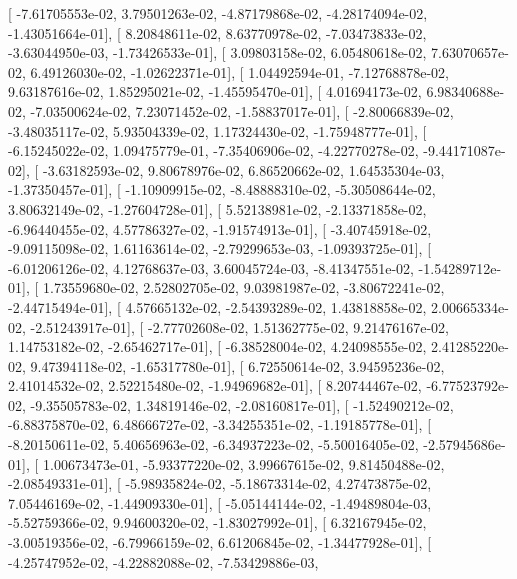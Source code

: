 \documentclass{article}
\begin{document}
       [ -7.61705553e-02,   3.79501263e-02,  -4.87179868e-02,
         -4.28174094e-02,  -1.43051664e-01],
       [  8.20848611e-02,   8.63770978e-02,  -7.03473833e-02,
         -3.63044950e-03,  -1.73426533e-01],
       [  3.09803158e-02,   6.05480618e-02,   7.63070657e-02,
          6.49126030e-02,  -1.02622371e-01],
       [  1.04492594e-01,  -7.12768878e-02,   9.63187616e-02,
          1.85295021e-02,  -1.45595470e-01],
       [  4.01694173e-02,   6.98340688e-02,  -7.03500624e-02,
          7.23071452e-02,  -1.58837017e-01],
       [ -2.80066839e-02,  -3.48035117e-02,   5.93504339e-02,
          1.17324430e-02,  -1.75948777e-01],
       [ -6.15245022e-02,   1.09475779e-01,  -7.35406906e-02,
         -4.22770278e-02,  -9.44171087e-02],
       [ -3.63182593e-02,   9.80678976e-02,   6.86520662e-02,
          1.64535304e-03,  -1.37350457e-01],
       [ -1.10909915e-02,  -8.48888310e-02,  -5.30508644e-02,
          3.80632149e-02,  -1.27604728e-01],
       [  5.52138981e-02,  -2.13371858e-02,  -6.96440455e-02,
          4.57786327e-02,  -1.91574913e-01],
       [ -3.40745918e-02,  -9.09115098e-02,   1.61163614e-02,
         -2.79299653e-03,  -1.09393725e-01],
       [ -6.01206126e-02,   4.12768637e-03,   3.60045724e-03,
         -8.41347551e-02,  -1.54289712e-01],
       [  1.73559680e-02,   2.52802705e-02,   9.03981987e-02,
         -3.80672241e-02,  -2.44715494e-01],
       [  4.57665132e-02,  -2.54393289e-02,   1.43818858e-02,
          2.00665334e-02,  -2.51243917e-01],
       [ -2.77702608e-02,   1.51362775e-02,   9.21476167e-02,
          1.14753182e-02,  -2.65462717e-01],
       [ -6.38528004e-02,   4.24098555e-02,   2.41285220e-02,
          9.47394118e-02,  -1.65317780e-01],
       [  6.72550614e-02,   3.94595236e-02,   2.41014532e-02,
          2.52215480e-02,  -1.94969682e-01],
       [  8.20744467e-02,  -6.77523792e-02,  -9.35505783e-02,
          1.34819146e-02,  -2.08160817e-01],
       [ -1.52490212e-02,  -6.88375870e-02,   6.48666727e-02,
         -3.34255351e-02,  -1.19185778e-01],
       [ -8.20150611e-02,   5.40656963e-02,  -6.34937223e-02,
         -5.50016405e-02,  -2.57945686e-01],
       [  1.00673473e-01,  -5.93377220e-02,   3.99667615e-02,
          9.81450488e-02,  -2.08549331e-01],
       [ -5.98935824e-02,  -5.18673314e-02,   4.27473875e-02,
          7.05446169e-02,  -1.44909330e-01],
       [ -5.05144144e-02,  -1.49489804e-03,  -5.52759366e-02,
          9.94600320e-02,  -1.83027992e-01],
       [  6.32167945e-02,  -3.00519356e-02,  -6.79966159e-02,
          6.61206845e-02,  -1.34477928e-01],
       [ -4.25747952e-02,  -4.22882088e-02,  -7.53429886e-03,
\end{document}
